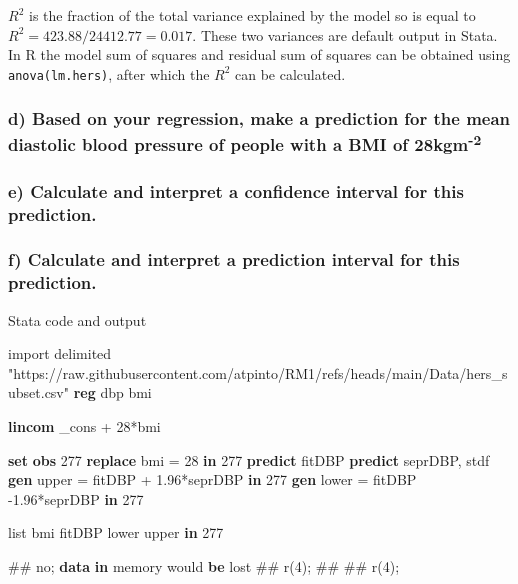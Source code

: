 \documentclass[
  letterpaper,
  DIV=11,
  numbers=noendperiod]{scrreprt}
\newenvironment{Shaded}{\begin{snugshade}}{\end{snugshade}}
\newcommand{\DataTypeTok}[1]{\textcolor[rgb]{0.68,0.00,0.00}{#1}}
\newcommand{\DecValTok}[1]{\textcolor[rgb]{0.68,0.00,0.00}{#1}}
\newcommand{\FunctionTok}[1]{\textcolor[rgb]{0.28,0.35,0.67}{#1}}
\newcommand{\KeywordTok}[1]{\textcolor[rgb]{0.00,0.23,0.31}{\textbf{#1}}}
\newcommand{\NormalTok}[1]{\textcolor[rgb]{0.00,0.23,0.31}{#1}}
\newcommand{\OtherTok}[1]{\textcolor[rgb]{0.00,0.23,0.31}{#1}}
\newcommand{\StringTok}[1]{\textcolor[rgb]{0.13,0.47,0.30}{#1}}
\begin{document}
\(R^2\) is the fraction of the total variance explained by the model so
is equal to \(R^{2} = 423.88/24412.77 = 0.017\). These two variances are
default output in Stata. In R the model sum of squares and residual sum
of squares can be obtained using \texttt{anova(lm.hers)}, after which
the \(R^2\) can be calculated.

\subsubsection{\texorpdfstring{d) Based on your regression, make a
prediction for the mean diastolic blood pressure of people with a BMI of
28kgm\textsuperscript{-2}}{d) Based on your regression, make a prediction for the mean diastolic blood pressure of people with a BMI of 28kgm-2}}\label{d-based-on-your-regression-make-a-prediction-for-the-mean-diastolic-blood-pressure-of-people-with-a-bmi-of-28kgm-2}

\subsubsection{e) Calculate and interpret a confidence interval for this
prediction.}\label{e-calculate-and-interpret-a-confidence-interval-for-this-prediction.}

\subsubsection{f) Calculate and interpret a prediction interval for this
prediction.}\label{f-calculate-and-interpret-a-prediction-interval-for-this-prediction.}

Stata code and output

\begin{Shaded}
\begin{Highlighting}[]
\NormalTok{import delimited }\StringTok{"https://raw.githubusercontent.com/atpinto/RM1/refs/heads/main/Data/hers\_subset.csv"}
\KeywordTok{reg}\NormalTok{ dbp bmi}

\KeywordTok{lincom} \DataTypeTok{\_cons}\NormalTok{ + 28*bmi}

\KeywordTok{set} \KeywordTok{obs}\NormalTok{ 277}
\KeywordTok{replace}\NormalTok{ bmi = 28 }\KeywordTok{in}\NormalTok{ 277}
\KeywordTok{predict}\NormalTok{ fitDBP}
\KeywordTok{predict}\NormalTok{ seprDBP, stdf}
\KeywordTok{gen} \FunctionTok{upper}\NormalTok{ = fitDBP + 1.96*seprDBP }\KeywordTok{in}\NormalTok{ 277}
\KeywordTok{gen} \FunctionTok{lower}\NormalTok{ = fitDBP {-}1.96*seprDBP }\KeywordTok{in}\NormalTok{ 277}

\OtherTok{list}\NormalTok{ bmi fitDBP }\FunctionTok{lower} \FunctionTok{upper} \KeywordTok{in}\NormalTok{ 277}

\NormalTok{\#\# no; }\KeywordTok{data} \KeywordTok{in} \DecValTok{memory}\NormalTok{ would }\KeywordTok{be}\NormalTok{ lost}
\NormalTok{\#\# }\FunctionTok{r}\NormalTok{(4);}
\NormalTok{\#\# }
\NormalTok{\#\# }\FunctionTok{r}\NormalTok{(4);}
\end{Highlighting}
\end{Shaded}
\end{document}
